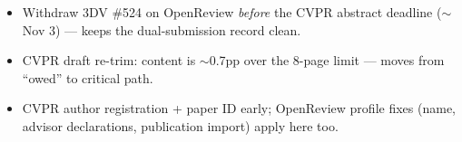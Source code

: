 \documentclass[11pt]{article}
\begin{document}
\begin{itemize}[leftmargin=1.4em,itemsep=2pt]
\item Withdraw 3DV \#524 on OpenReview \emph{before} the CVPR abstract deadline
($\sim$Nov 3) --- keeps the dual-submission record clean.
\item CVPR draft re-trim: content is $\sim$0.7pp over the 8-page limit --- moves from ``owed''
to critical path.
\item CVPR author registration + paper ID early; OpenReview profile fixes (name, advisor
declarations, publication import) apply here too.
\end{itemize}
\end{document}
